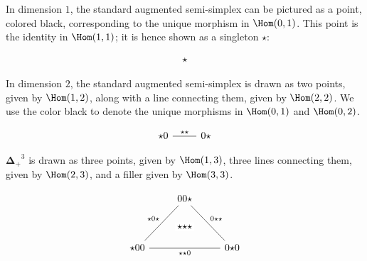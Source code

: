 \documentclass[10pt]{art.cls/art}
\newcommand{\DeltaPlus}{\ensuremath{\boldsymbol{\Delta}_+}}
\newcommand{\kstar}{{\star}}
\begin{document}
\begin{example}[$\DeltaPlus^1$]
  In dimension $1$, the standard augmented semi-simplex can be pictured as a point, colored black, corresponding to the unique morphism in $\Hom(0, 1)$. This point is the identity in $\Hom(1, 1)$; it is hence shown as a singleton $\kstar$:

  \begin{equation*}
    \begin{tikzcd}
      \kstar
    \end{tikzcd}
  \end{equation*}
\end{example}

\begin{example}[$\DeltaPlus^2$]
  In dimension $2$, the standard augmented semi-simplex is drawn as two points, given by $\Hom(1, 2)$, along with a line connecting them, given by $\Hom(2, 2)$. We use the color black to denote the unique morphisms in $\Hom(0, 1)$ and $\Hom(0, 2)$.

  \begin{equation*}
    \begin{tikzcd}
      \kstar0 \arrow[r, dash, "\kstar\kstar"] & 0\kstar
    \end{tikzcd}
  \end{equation*}
\end{example}

\begin{example}[$\DeltaPlus^3$]
  $\DeltaPlus^3$ is drawn as three points, given by $\Hom(1, 3)$, three lines connecting them, given by $\Hom(2, 3)$, and a filler given by $\Hom(3, 3)$.

  \begin{equation*}
    \begin{tikzcd}
      & |[alias=F]|00\kstar \arrow[ddr, dash, "0\kstar\kstar"] & \\\\
      \kstar00 \arrow[rr, dash, "\kstar\kstar0"{name=T, below}]\arrow[uur, dash, "\kstar0\kstar"] && 0\kstar0 \\
      \arrow[rightarrow, from=F, to=T, phantom, "\kstar\kstar\kstar" description]
    \end{tikzcd}
  \end{equation*}
\end{example}
\end{document}
